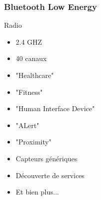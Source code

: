 \begin{frame}
	\frametitle{Bluetooth Low Energy}
	\begin{minipage}[t]{0.30\linewidth}
		\vspace{0.5cm}
		\begin{block}{Radio}
			\begin{itemize}
				\item 2.4 GHZ
				\item 40 canaux
			\end{itemize}
		\end{block}
	\end{minipage}
	\begin{minipage}[t]{0.66\linewidth}
		\vspace{0.5cm}
		\vspace{0.5cm}
		\begin{itemize}
			\item "Healthcare"
			\item "Fitness"
			\item "Human Interface Device"
			\item "ALert"
			\item "Proximity"
			\item Capteurs génériques
			\item Découverte de services
			\item Et bien plus...
		\end{itemize}
	\end{minipage}

\end{frame}

